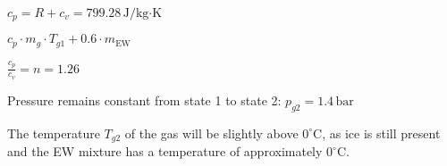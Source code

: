 \( c_p = R + c_v = 799.28 \, \text{J/kg·K} \)  

\( c_p \cdot m_g \cdot T_{g1} + 0.6 \cdot m_{\text{EW}} \)  

\( \frac{c_p}{c_v} = n = 1.26 \)  

Pressure remains constant from state 1 to state 2:  
\( p_{g2} = 1.4 \, \text{bar} \)  

The temperature \( T_{g2} \) of the gas will be slightly above \( 0^\circ \text{C} \), as ice is still present and the EW mixture has a temperature of approximately \( 0^\circ \text{C} \).